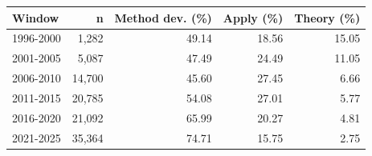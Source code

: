 \begin{tabular}{@{}lrrrr@{}}
\toprule
Window & n & Method dev. (\%) & Apply (\%) & Theory (\%) \\
\midrule
1996-2000 & 1,282 & 49.14 & 18.56 & 15.05 \\
2001-2005 & 5,087 & 47.49 & 24.49 & 11.05 \\
2006-2010 & 14,700 & 45.60 & 27.45 & 6.66 \\
2011-2015 & 20,785 & 54.08 & 27.01 & 5.77 \\
2016-2020 & 21,092 & 65.99 & 20.27 & 4.81 \\
2021-2025 & 35,364 & 74.71 & 15.75 & 2.75 \\
\bottomrule
\end{tabular}
